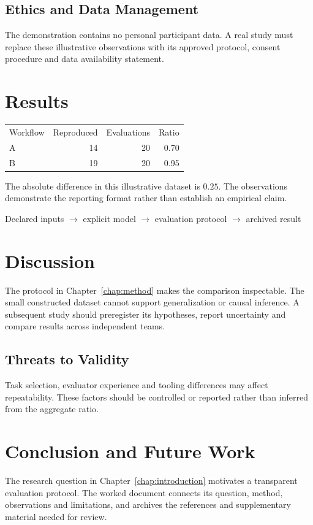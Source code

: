 \section{Ethics and Data Management}
The demonstration contains no personal participant data. A real study must replace these illustrative observations with its approved protocol, consent procedure and data availability statement.

\chapter{Results}
\begin{Table}[title=Illustrative repeatability observations]
\begin{tabular}{lrrr}
  Workflow & Reproduced & Evaluations & Ratio \\
  A & 14 & 20 & 0.70 \\
  B & 19 & 20 & 0.95
\end{tabular}
\end{Table}
The absolute difference in this illustrative dataset is $0.25$. The observations demonstrate the reporting format rather than establish an empirical claim.
\begin{Figure}[title=Research evidence chain,height=3cm,anchor=center,justify=center]
  Declared inputs $\longrightarrow$ explicit model $\longrightarrow$ evaluation protocol $\longrightarrow$ archived result
\end{Figure}

\chapter{Discussion}
The protocol in Chapter~\ref{chap:method} makes the comparison inspectable. The small constructed dataset cannot support generalization or causal inference. A subsequent study should preregister its hypotheses, report uncertainty and compare results across independent teams.
\section{Threats to Validity}
Task selection, evaluator experience and tooling differences may affect repeatability. These factors should be controlled or reported rather than inferred from the aggregate ratio.

\chapter{Conclusion and Future Work}
The research question in Chapter~\ref{chap:introduction} motivates a transparent evaluation protocol. The worked document connects its question, method, observations and limitations, and archives the references and supplementary material needed for review.

